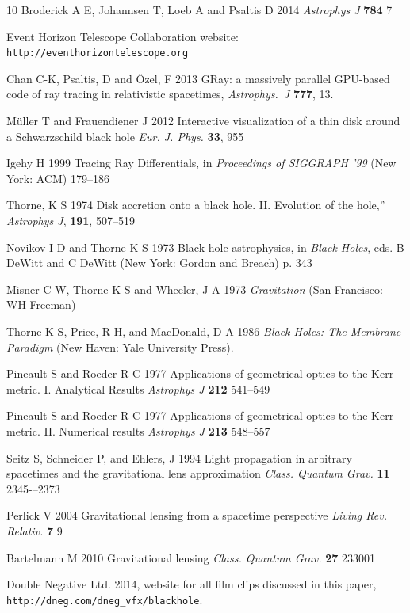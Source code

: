 \documentclass[12pt]{iopart}
\begin{document}
\begin{thebibliography}{10}
 Broderick A E, Johannsen T, Loeb A and Psaltis D 2014 {\it Astrophys J} {\bf 784} 7

 Event Horizon Telescope Collaboration website: \verb"http://eventhorizontelescope.org"

 Chan C-K, Psaltis, D and \"Ozel, F 2013 GRay: a massively parallel GPU-based code of ray tracing in relativistic spacetimes, {\it Astrophys.\ J} {\bf 777}, 13.

 M\"uller T and Frauendiener J 2012 Interactive visualization of a thin disk around a Schwarzschild black hole {\it Eur. J. Phys.} {\bf 33}, 955

 Igehy H 1999 Tracing Ray Differentials, in {\it Proceedings of SIGGRAPH '99} (New York: ACM) 179--186

 Thorne, K S  1974 Disk accretion onto a black hole.  II.  Evolution
of the hole,'' {\it Astrophys J}, {\bf 191}, 507--519

 Novikov I D and Thorne K S 1973 Black hole astrophysics, in {\it Black Holes}, eds. B DeWitt and C DeWitt (New York: Gordon and Breach) p. 343

 Misner C W, Thorne K S and Wheeler, J A 1973 {\it Gravitation}
(San Francisco: WH Freeman)

 Thorne K S, Price, R H, and MacDonald, D A 1986 {\it Black Holes: The
Membrane Paradigm} (New Haven: Yale University Press).

 Pineault S and Roeder R C 1977 Applications of geometrical optics to the 
Kerr metric. I. Analytical Results {\it Astrophys J} {\bf 212} 541--549

 Pineault S and Roeder R C 1977 Applications of geometrical optics to the 
Kerr metric. II. Numerical results {\it Astrophys J} {\bf 213} 548--557

 Seitz S, Schneider P, and Ehlers, J 1994 Light propagation in arbitrary spacetimes and the gravitational lens approximation {\it Class. Quantum Grav.} {\bf 11} 2345-–2373

 Perlick V 2004 Gravitational lensing from a spacetime perspective {\it Living Rev. Relativ.} {\bf 7} 9

 Bartelmann M 2010 Gravitational lensing {\it Class. Quantum Grav.} {\bf 27} 233001

 Double Negative Ltd. 2014, website for all film clips discussed in this paper,
\verb"http://dneg.com/dneg_vfx/blackhole".


\end{thebibliography}
\end{document}
